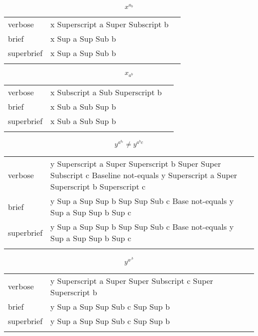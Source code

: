 \E \[x^{a_b}\]
\begin{longtable}[c]{@{}lll@{}}
\toprule\addlinespace
verbose & x Superscript a Super Subscript b &

\\\addlinespace
brief & x Sup a Sup Sub b &

\\\addlinespace
superbrief & x Sup a Sup Sub b &

\\\addlinespace
\bottomrule
\end{longtable}


\E \[x_{a^b}\]
\begin{longtable}[c]{@{}lll@{}}
\toprule\addlinespace
verbose & x Subscript a Sub Superscript b &

\\\addlinespace
brief & x Sub a Sub Sup b &

\\\addlinespace
superbrief & x Sub a Sub Sup b &

\\\addlinespace
\bottomrule
\end{longtable}


\E \[y^{a^{b_c}}\neq y^{a^{b}c}\]
\begin{longtable}[c]{@{}lll@{}}
\toprule\addlinespace
verbose & y Superscript a Super Superscript b Super Super Subscript c
Baseline not-equals y Superscript a Super Superscript b Superscript c &

\\\addlinespace
brief & y Sup a Sup Sup b Sup Sup Sub c Base not-equals y Sup a Sup Sup
b Sup c &

\\\addlinespace
superbrief & y Sup a Sup Sup b Sup Sup Sub c Base not-equals y Sup a Sup
Sup b Sup c &

\\\addlinespace
\bottomrule
\end{longtable}


\E \[y^{a^{{}_{c}b}}\]
\begin{longtable}[c]{@{}lll@{}}
\toprule\addlinespace
verbose & y Superscript a Super Super Subscript c Super Superscript b &

\\\addlinespace
brief & y Sup a Sup Sup Sub c Sup Sup b &

\\\addlinespace
superbrief & y Sup a Sup Sup Sub c Sup Sup b &

\\\addlinespace
\bottomrule
\end{longtable}


